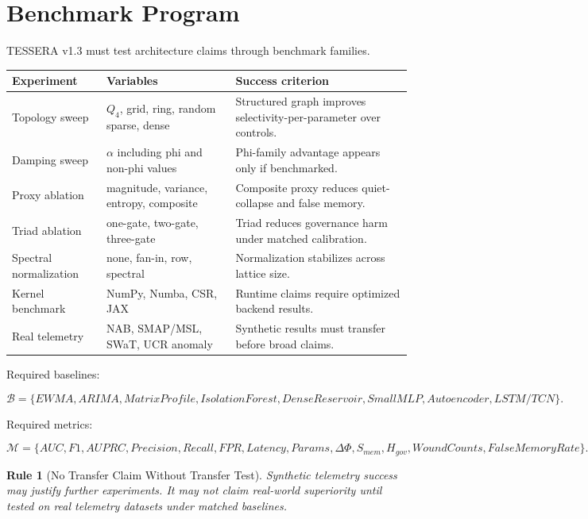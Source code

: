 \documentclass[12pt]{article}
\newtheorem{rulebox}{Rule}
\begin{document}
\section{Benchmark Program}

TESSERA v1.3 must test architecture claims through benchmark families.

\begin{longtable}{p{}p{}p{}}
\toprule
\textbf{Experiment} & \textbf{Variables} & \textbf{Success criterion} \\
\midrule
Topology sweep & \(Q_4\), grid, ring, random sparse, dense & Structured graph improves selectivity-per-parameter over controls. \\
Damping sweep & \(\alpha\) including phi and non-phi values & Phi-family advantage appears only if benchmarked. \\
Proxy ablation & magnitude, variance, entropy, composite & Composite proxy reduces quiet-collapse and false memory. \\
Triad ablation & one-gate, two-gate, three-gate & Triad reduces governance harm under matched calibration. \\
Spectral normalization & none, fan-in, row, spectral & Normalization stabilizes across lattice size. \\
Kernel benchmark & NumPy, Numba, CSR, JAX & Runtime claims require optimized backend results. \\
Real telemetry & NAB, SMAP/MSL, SWaT, UCR anomaly & Synthetic results must transfer before broad claims. \\
\bottomrule
\end{longtable}

Required baselines:

\[
\mathcal{B}=
\{EWMA,ARIMA,MatrixProfile,IsolationForest,DenseReservoir,SmallMLP,Autoencoder,LSTM/TCN\}.
\]

Required metrics:

\[
\mathcal{M}=
\{AUC,F1,AUPRC,Precision,Recall,FPR,Latency,Params,
\Delta\Phi,S_{mem},H_{gov},WoundCounts,FalseMemoryRate\}.
\]

\begin{rulebox}[No Transfer Claim Without Transfer Test]
Synthetic telemetry success may justify further experiments. It may not claim
real-world superiority until tested on real telemetry datasets under matched
baselines.
\end{rulebox}
\end{document}
